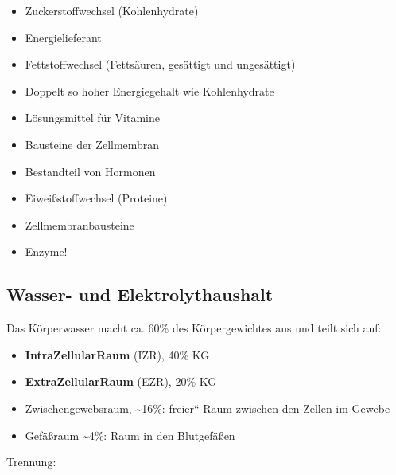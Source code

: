 \documentclass{article}
\newcommand\gT[1]{\textbf{\textup{\textcolor[rgb]{0.0,0.5019608,0.0}{#1}}}}
\begin{document}
\begin{itemize}
\item {\mdseries
Zuckerstoffwechsel (Kohlenhydrate)}

\end{itemize}
\begin{itemize}
\item {\mdseries
Energielieferant }

\end{itemize}
\begin{itemize}
\item {\mdseries
Fettstoffwechsel (Fetts\"auren, ges\"attigt und  unges\"attigt)}

\end{itemize}
\begin{itemize}
\item {\mdseries
Doppelt so hoher Energiegehalt wie  Kohlenhydrate}

\item {\mdseries
L\"osungsmittel f\"ur Vitamine}

\item {\mdseries
Bausteine der Zellmembran}

\item {\mdseries
Bestandteil von Hormonen}

\end{itemize}
\begin{itemize}
\item {\mdseries
Eiwei{\ss}stoffwechsel (Proteine)}

\end{itemize}
\begin{itemize}
\item {\mdseries
Zellmembranbausteine}

\item {\mdseries
Enzyme!}

\end{itemize}
\subsection[Wasser- und Elektro\-lyt\-haus\-halt]{%
%
Wasser- und Elektro\-lyt\-haus\-halt}
{\mdseries
Das K\"orperwasser macht ca. 60\% des K\"orpergewichtes aus und teilt
sich auf:}

\begin{itemize}
\item {\mdseries
\gT{IntraZellularRaum} (IZR), 40\% KG }

\item {\mdseries
\gT{ExtraZellularRaum} (EZR), 20\% KG }

\end{itemize}
\begin{itemize}
\item {\mdseries
{}Zwischengewebsraum, \~{}16\%:
{\quotedblbase}freier{\textquotedblleft} Raum zwischen den Zellen im
Gewebe}

\item {\mdseries
{}Gef\"a{\ss}raum \~{}4\%: Raum in den
Blutgef\"a{\ss}en}

\end{itemize}
{\mdseries\color{black}
Trennung: }
\end{document}

